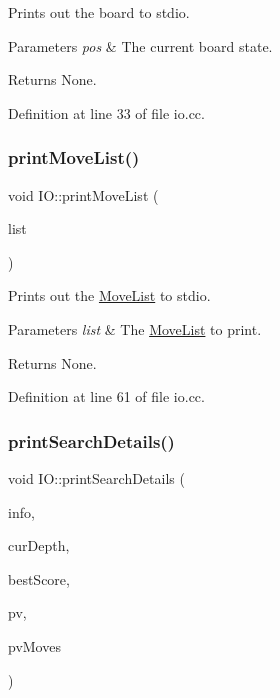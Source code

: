 Prints out the board to stdio. 


\begin{DoxyParams}{Parameters}
{\em pos} & The current board state. \\
\hline
\end{DoxyParams}
\begin{DoxyReturn}{Returns}
None. 
\end{DoxyReturn}


Definition at line 33 of file io.\+cc.

\mbox{\label{namespaceIO_a34aa1665a2c3f474c1073f0ff9b67db0}} 
\subsubsection{\texorpdfstring{print\+Move\+List()}{printMoveList()}}
{\footnotesize\ttfamily void I\+O\+::print\+Move\+List (\begin{DoxyParamCaption}\item[{const \mbox{\hyperlink{classMoveList}{Move\+List}} \&}]{list }\end{DoxyParamCaption})\hspace{0.3cm}{\ttfamily [noexcept]}}



Prints out the \mbox{\hyperlink{classMoveList}{Move\+List}} to stdio. 


\begin{DoxyParams}{Parameters}
{\em list} & The \mbox{\hyperlink{classMoveList}{Move\+List}} to print. \\
\hline
\end{DoxyParams}
\begin{DoxyReturn}{Returns}
None. 
\end{DoxyReturn}


Definition at line 61 of file io.\+cc.

\mbox{\label{namespaceIO_a029095064998d6f3bcf6022cf2876705}} 
\subsubsection{\texorpdfstring{print\+Search\+Details()}{printSearchDetails()}}
{\footnotesize\ttfamily void I\+O\+::print\+Search\+Details (\begin{DoxyParamCaption}\item[{const \mbox{\hyperlink{structSearchInfo}{Search\+Info}} \&}]{info,  }\item[{int32\+\_\+t}]{cur\+Depth,  }\item[{int32\+\_\+t}]{best\+Score,  }\item[{\mbox{\hyperlink{classPvTable}{Pv\+Table}} \&}]{pv,  }\item[{int32\+\_\+t}]{pv\+Moves }\end{DoxyParamCaption})\hspace{0.3cm}{\ttfamily [noexcept]}}



